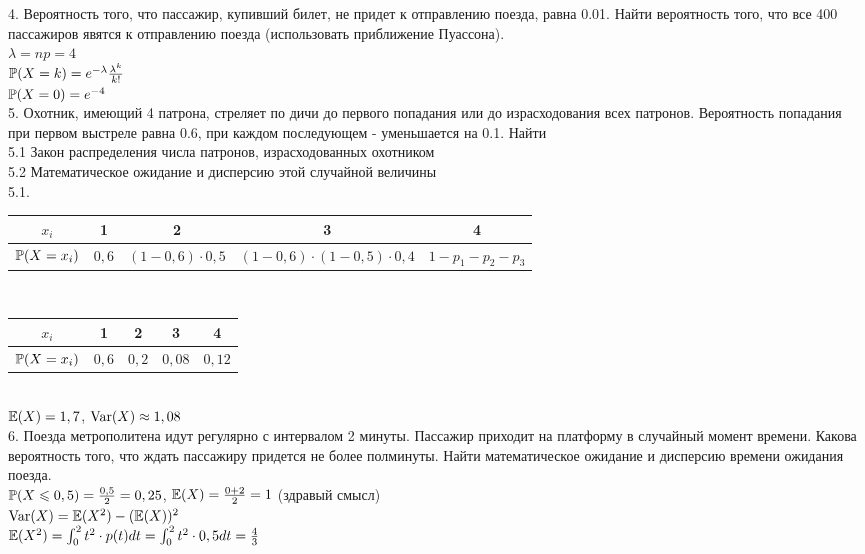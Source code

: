 \documentclass[12pt, a4paper]{article}\usepackage[]{graphicx}\usepackage[]{color}
\begin{document}
4.  Вероятность того, что пассажир, купивший билет, не придет к
отправлению поезда, равна 0.01. Найти вероятность того, что все
400 пассажиров явятся к отправлению поезда (использовать
приближение Пуассона). \\
$\lambda=np=4$ \\
$\P(X=k)=e^{-\lambda}\frac{\lambda^{k}}{k!}$ \\
$\P(X=0)=e^{-4}$ \\




5.  Охотник, имеющий 4 патрона, стреляет по дичи до первого
попадания или до израсходования всех патронов. Вероятность
попадания при первом выстреле равна 0.6, при каждом последующем -
уменьшается на 0.1. Найти \\
5.1 Закон распределения числа патронов, израсходованных охотником \\
5.2 Математическое ожидание и дисперсию этой случайной величины \\
5.1. \\
\begin{tabular}{|c|c|c|c|c|}
  \hline
  $x_{i}$ & 1 & 2 & 3 & 4 \\
  \hline
  $\P(X=x_{i})$ & $0,6$& $(1-0,6)\cdot 0,5$ & $(1-0,6)\cdot(1-0,5)\cdot 0,4$ & $1-p_{1}-p_{2}-p_{3}$ \\
  \hline
\end{tabular} \\
\begin{tabular}{|c|c|c|c|c|}
  \hline
  $x_{i}$ & 1 & 2 & 3 & 4 \\
  \hline
  $\P(X=x_{i})$ & $0,6$& $0,2$ & $0,08$ & $0,12$ \\
  \hline
\end{tabular} \\
$\E(X)=1,7$, $\Var(X)\approx 1,08$ \\

6.  Поезда метрополитена идут регулярно с интервалом 2 минуты.
Пассажир приходит на платформу в случайный момент времени. Какова
вероятность того, что ждать пассажиру придется не более полминуты.
Найти математическое ожидание и дисперсию времени ожидания поезда.
\\
$\P(X\le 0,5)=\frac{0,5}{2}=0,25$, $\E(X)=\frac{0+2}{2}=1$ (здравый
смысл) \\
$\Var(X)=\E(X^{2})-(\E(X))^{2}$ \\
$\E(X^{2})=\int_{0}^{2}t^{2}\cdot p(t)dt=\int_{0}^{2}t^{2}\cdot
0,5dt=\frac{4}{3}$ \\
\end{document}
